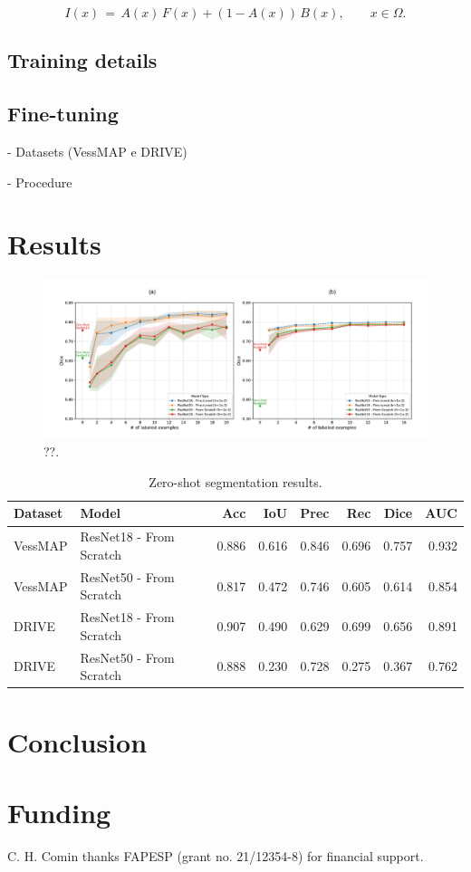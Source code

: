 \documentclass[%
reprint,
nofootinbib,
 amsmath,amssymb,
aps,
superscriptaddress,
showkeys,
longbibliography
]{revtex4-1}
\begin{document}
\begin{equation}
I(x) \,=\, A(x)\,F(x) + (1-A(x))\,B(x), \qquad x \in \Omega.
\label{eq:compose}
\end{equation}

\subsection{Training details}

\subsection{Fine-tuning}

- Datasets (VessMAP e DRIVE)

- Procedure

\section{Results}
\label{s:results}

\begin{figure}[tbp]
    \centering
    \includegraphics[width=\textwidth]{figures/results/results_charts_normalized.pdf}
    \caption{??.}
    \label{f:results_charts_normalized}
\end{figure}


\begin{table}[t]
\caption{Zero-shot segmentation results.}
\label{tab:zero_shot_results}
\centering
\begingroup
\small
\setlength{\tabcolsep}{3pt}
\renewcommand{\arraystretch}{1.15}
\begin{tabularx}{\textwidth}{l X r r r r r r}
\hline
	\textbf{Dataset} & \textbf{Model} & \textbf{Acc} & \textbf{IoU} & \textbf{Prec} & \textbf{Rec} & \textbf{Dice} & \textbf{AUC} \\
\hline
VessMAP & ResNet18 - From Scratch & 0.886 & 0.616 & 0.846 & 0.696 & 0.757 & 0.932 \\
VessMAP & ResNet50 - From Scratch & 0.817 & 0.472 & 0.746 & 0.605 & 0.614 & 0.854 \\
\hline
DRIVE & ResNet18 - From Scratch & 0.907 & 0.490 & 0.629 & 0.699 & 0.656 & 0.891 \\
DRIVE & ResNet50 - From Scratch & 0.888 & 0.230 & 0.728 & 0.275 & 0.367 & 0.762 \\
\hline
\end{tabularx}
\endgroup
\end{table}


\section{Conclusion}
\label{s:conclusion}




\section*{Funding}
C. H. Comin thanks FAPESP (grant no. 21/12354-8) for financial support. 



\end{document}
